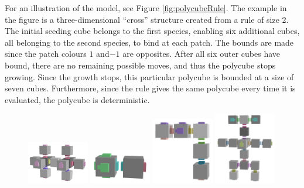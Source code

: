 For an illustration of the model, see Figure \ref{fig:polycubeRule}. The example in the figure is a three-dimensional ``cross'' structure created from a rule of size 2. The initial seeding cube belongs to the first species, enabling six additional cubes, all belonging to the second species, to bind at each patch. The bounds are made since the patch colours \(1\) and\( -1\) are opposites. After all six outer cubes have bound, there are no remaining possible moves, and thus the polycube stops growing. Since the growth stops, this particular polycube is bounded at a size of seven cubes. Furthermore, since the rule gives the same polycube every time it is evaluated, the polycube is deterministic.

\begin{figure}
    \centering\includegraphics[align=c,width=0.24\textwidth]{figures/dnaRoboticPolycubes/doubleplus.png}\hfill
    \centering\includegraphics[align=c,width=0.24\textwidth]{figures/dnaRoboticPolycubes/swimmer.png}\hfill
    \centering\includegraphics[align=c,width=0.24\textwidth]{figures/dnaRoboticPolycubes/L.png}\hfill
    \centering\includegraphics[align=c,width=0.24\textwidth]{figures/dnaRoboticPolycubes/robot.png}

\end{figure}
